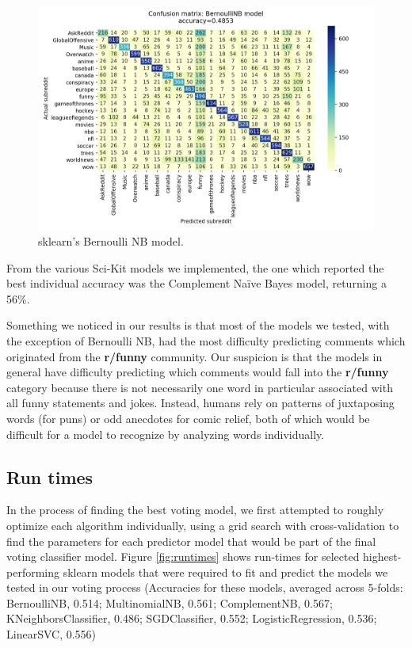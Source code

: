 \documentclass[letterpaper, 11pt]{article}
\begin{document}
\begin{figure}
    \centering
    \includegraphics[width=\textwidth/2]{images/bnb}
    \caption{sklearn's Bernoulli NB model.}
    \label{fig:bnb}
\end{figure}

From the various Sci-Kit models we implemented, the one which reported the best individual accuracy was the Complement Na\"ive Bayes model, returning a 56\%.  

Something we noticed in our results is that most of the models we tested, with the exception of Bernoulli NB, had the most difficulty predicting comments which originated from the \textbf{r/funny} community. Our suspicion is that the models in general have difficulty predicting which comments would fall into the \textbf{r/funny} category because there is not necessarily one word in particular associated with all funny statements and jokes. Instead, humans rely on patterns of juxtaposing words (for puns) or odd anecdotes for comic relief, both of which would be difficult for a model to recognize by analyzing words individually. 

\subsection{Run times}

In the process of finding the best voting model, we first attempted to roughly optimize each algorithm individually, using a grid search with cross-validation to find the parameters for each predictor model that would be part of the final voting classifier model. Figure \ref{fig:runtimes} shows run-times for selected highest-performing sklearn models that were required to fit and predict the models we tested in our voting process (Accuracies for these models, averaged across 5-folds: 
BernoulliNB, 0.514; 
MultinomialNB, 0.561;
ComplementNB, 0.567;
KNeighborsClassifier, 0.486;
SGDClassifier, 0.552;
LogisticRegression, 0.536;
LinearSVC, 0.556)
\end{document}
